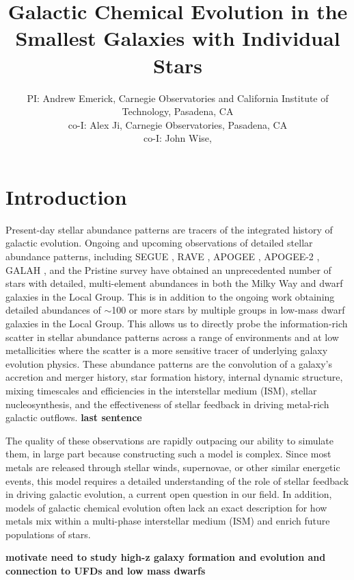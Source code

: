 \documentclass[12pt]{article} %
\title{\vspace{-5ex} \Large Galactic Chemical Evolution in the Smallest Galaxies with Individual Stars
       \vspace{-2ex}}
\author{\small PI: Andrew Emerick, Carnegie Observatories and California Institute of Technology, Pasadena, CA \\
\small co-I: Alex Ji, Carnegie Observatories, Pasadena, CA \\
\small co-I: John Wise,
}
\date{\vspace{-5ex}}
\begin{document}
 \thispagestyle{empty}


\maketitle

\section{Introduction}
Present-day stellar abundance patterns are tracers of the integrated history of galactic evolution. Ongoing and upcoming observations of detailed stellar abundance patterns, including SEGUE \citep{Yanny2009}, RAVE \citep{Kunder2017}, APOGEE \citep{Anders2014}, APOGEE-2 \citep{Majewski2016}, GALAH \citep{Buder2018}, and the Pristine survey \citep{Starkenburg2017} have obtained an unprecedented number of stars with detailed, multi-element abundances in both the Milky Way and dwarf galaxies in the Local Group. This is in addition to the ongoing work obtaining detailed abundances of $\sim$100 or more stars by multiple groups \cite[e.g.][ (need more!) ]{Hill2019} in low-mass dwarf galaxies in the Local Group. This allows us to directly probe the information-rich scatter in stellar abundance patterns across a range of environments and at low metallicities where the scatter is a more sensitive tracer of underlying galaxy evolution physics. These abundance patterns are the convolution of a galaxy's accretion and merger history, star formation history, internal dynamic structure, mixing timescales and efficiencies in the interstellar medium (ISM), stellar nucleosynthesis, and the effectiveness of stellar feedback in driving metal-rich galactic outflows. \textbf{last sentence}

The quality of these observations are rapidly outpacing our ability to simulate them, in large part because constructing such a model is complex.  Since most metals are released through stellar winds, supernovae, or other similar energetic events, this model requires a detailed understanding of the role of stellar feedback in driving galactic evolution, a current open question in our field.  In addition, models of galactic chemical evolution often lack an exact description for how metals mix within a multi-phase interstellar medium (ISM) and enrich future populations of stars.

\textbf{motivate need to study high-z galaxy formation and evolution and connection to UFDs and low mass dwarfs}
\end{document}
